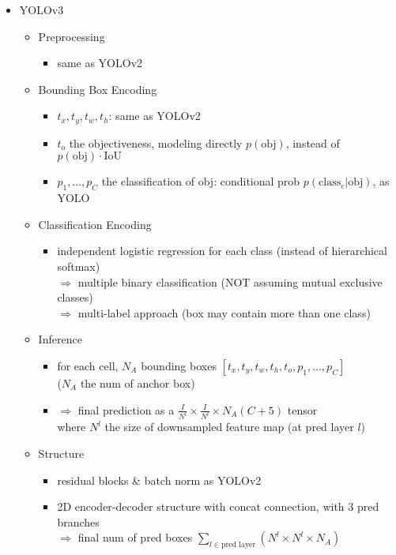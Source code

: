 \begin{itemize}
\item YOLOv3
	\begin{itemize}
	\item Preprocessing
		\begin{itemize}
		\item same as YOLOv2
		\end{itemize}
	\item Bounding Box Encoding
		\begin{itemize}
		\item $t_x,t_y,t_w,t_h$: same as YOLOv2
		\item $t_o$ the objectiveness, modeling directly $p(\text{obj})$, instead of $p(\text{obj})\cdot\text{IoU}$
		\item $p_1,...,p_C$ the classification of obj: conditional prob $p(\text{class}_c|\text{obj})$, as YOLO
		\end{itemize}
	\item Classification Encoding
		\begin{itemize}
		\item independent logistic regression for each class (instead of hierarchical softmax) \\ 
		$\Rightarrow$ multiple binary classification (NOT assuming mutual exclusive classes) \\
		$\Rightarrow$ multi-label approach (box may contain more than one class)
		\end{itemize}
	\item Inference
		\begin{itemize}
		\item for each cell, $N_A$ bounding boxes $[t_x, t_y, t_w, t_h, t_o, p_1,...,p_C]$ \\
		($N_A$ the num of anchor box)
		\item $\Rightarrow$ final prediction as a $\frac I{N^l} \times \frac I{N^l} \times N_A(C+5)$ tensor \\
		where $N^l$ the size of downsampled feature map (at pred layer $l$)
		\end{itemize}
	\item Structure
		\begin{itemize}
		\item residual blocks \& batch norm as YOLOv2
		\item 2D encoder-decoder structure with concat connection, with $3$ pred branches \\
		$\Rightarrow$ final num of pred boxes $\displaystyle\sum_{l\in\text{pred layer}}(N^l\times N^l\times N_A)$
		\begin{figure}[ht]

\end{figure}
\end{itemize}
\end{itemize}
\end{itemize}
